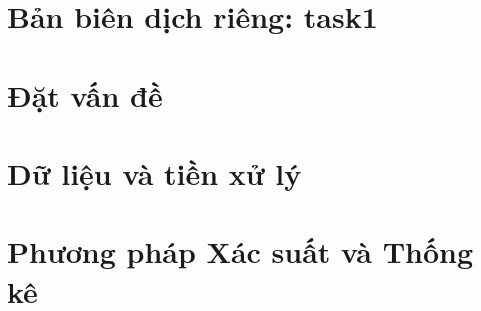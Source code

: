 \documentclass[13pt,a4paper,oneside]{extreport}
\begin{document}
\chapter*{Bản biên dịch riêng: task1}
\chapter{Đặt vấn đề}

\chapter{Dữ liệu và tiền xử lý}

\chapter{Phương pháp Xác suất và Thống kê}

\printbibliography
\end{document}

